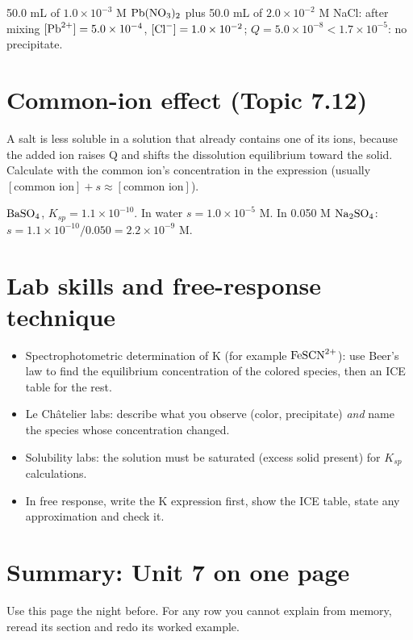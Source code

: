 \documentclass[11pt]{article}
\begin{document}
 50.0 mL of $1.0\times10^{-3}$ M $\ce{Pb(NO3)2}$ plus 50.0 mL of $2.0\times10^{-2}$ M NaCl: after mixing $[\ce{Pb^2+}] = 5.0\times10^{-4}$, $[\ce{Cl-}] = 1.0\times10^{-2}$; $Q = 5.0\times10^{-8} < 1.7\times10^{-5}$: no precipitate.

\section{Common-ion effect (Topic 7.12)}\label{t:7.12}
A salt is less soluble in a solution that already contains one of its ions, because the added ion raises Q and shifts the dissolution equilibrium toward the solid. Calculate with the common ion's concentration in the expression (usually $[\text{common ion}] + s \approx [\text{common ion}]$).

 $\ce{BaSO4}$, $K_{sp} = 1.1\times10^{-10}$. In water $s = 1.0\times10^{-5}$ M. In 0.050 M $\ce{Na2SO4}$: $s = 1.1\times10^{-10}/0.050 = 2.2\times10^{-9}$ M.

\section{Lab skills and free-response technique}\label{t:lab}
\begin{itemize}
\item Spectrophotometric determination of K (for example $\ce{FeSCN^2+}$): use Beer's law to find the equilibrium concentration of the colored species, then an ICE table for the rest.
\item Le Châtelier labs: describe what you observe (color, precipitate) \emph{and} name the species whose concentration changed.
\item Solubility labs: the solution must be saturated (excess solid present) for $K_{sp}$ calculations.
\item In free response, write the K expression first, show the ICE table, state any approximation and check it.
\end{itemize}

\clearpage
\section*{Summary: Unit 7 on one page}
Use this page the night before. For any row you cannot explain from memory, reread its section and redo its worked example.
\end{document}
